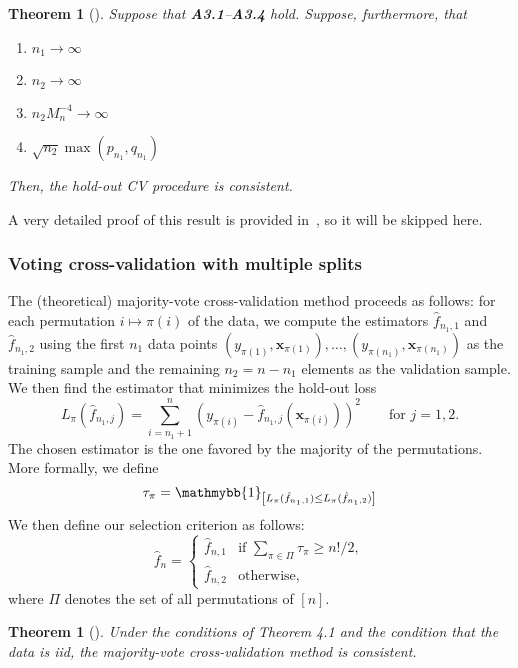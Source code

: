 \documentclass[12pt, letter paper]{article}
\newcommand{\1}{\mathmybb{1}}
\newtheorem{theorem}[proposition]{Theorem}
\newcommand{\0}{\emptyset}
\newcommand{\paren}[1]{\left(#1 \right)}
\newcommand{\sqbr}[1]{\left[#1 \right]}
\newcommand{\ind}[1]{\mathmybb{1}_{\sqbr{#1}}}
\newcommand{\x}{\boldsymbol{x}}
\newcommand{\fhat}[2]{\hat{f}_{#1, #2}}
\begin{document}
\begin{theorem}[\cite{yang_2007}]\label{prop:yangth1}
    Suppose that \textbf{A3.1}--\textbf{A3.4} hold. Suppose, furthermore, that
    \begin{enumerate}
        \item \(n_{1}\to\infty\)
        \item \(n_{2}\to\infty\)
        \item \(n_{2}M_{n}^{-4} \to \infty\)
        \item \(\sqrt{n_{2}}\max(p_{n_{1}}, q_{n_{1}})\)
    \end{enumerate}
    Then, the hold-out CV procedure is consistent.
\end{theorem}

A very detailed proof of this result is provided in~\textcite{yang_2007}, so it will be skipped here.

\subsubsection{Voting cross-validation with multiple splits}

The (theoretical) majority-vote cross-validation method proceeds as follows: for each permutation \(i\mapsto\pi(i)\) of the data, we compute the estimators \(\fhat{n_{1}}{1}\) and \(\fhat{n_{1}}{2}\) using the first \(n_{1}\) data points \((y_{\pi(1)}, \x_{\pi(1)}), \ldots,(y_{\pi(n_1)}, \x_{\pi(n_1)})\) as the training sample and the remaining \(n_{2}=n-n_{1}\) elements as the validation sample. We then find the estimator that minimizes the hold-out loss
\[L_{\pi}(\fhat{n_{1}}{j}) = \sum_{i=n_{1}+1}^{n}\paren{y_{\pi(i)} - \fhat{n_{1}}{j}\paren{\x_{\pi(i)}}}^{2}\qquad \text{for }j=1,2.\]
The chosen estimator is the one favored by the majority of the permutations. More formally, we define 
\[\tau_{\pi} = \ind{L_{\pi}(\fhat{n_{1}}{1}) \leq L_{\pi}(\fhat{n_{1}}{2})}\]
We then define our selection criterion as follows:
\[\hat{f}_{n} = \begin{cases}
    \fhat{n}{1} &\text{if }\sum_{\pi\in\Pi}\tau_{\pi} \geq {n!}/{2},\\[2mm]
    \fhat{n}{2} &\text{otherwise,}
\end{cases}\]
where \(\Pi\) denotes the set of all permutations of \([n]\).

\begin{theorem}[\cite{yang_2007}]\label{prop:yangth2}
    Under the conditions of Theorem 4.1 and the condition that the data is iid, the majority-vote cross-validation method is consistent.
\end{theorem}
\end{document}
